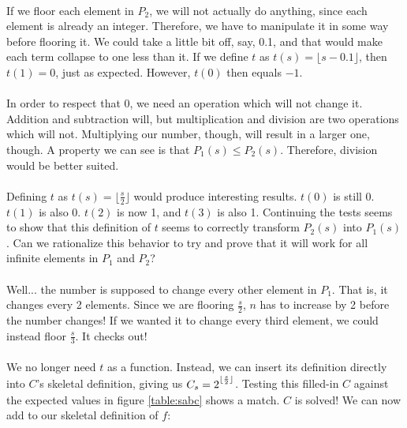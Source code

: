 \documentclass[12pt,letterpaper]{article}
\begin{document}
			\paragraph{} If we floor each element in $P_2$, we will not actually do anything, since each element is already an integer. Therefore, we have to manipulate it in some way before flooring it. We could take a little bit off, say, 0.1, and that would make each term collapse to one less than it. If we define $t$ as $t(s) = \lfloor s - 0.1 \rfloor$, then $t(1) = 0$, just as expected. However, $t(0)$ then equals $-1$.
			
			\paragraph{} In order to respect that 0, we need an operation which will not change it. Addition and subtraction will, but multiplication and division are two operations which will not. Multiplying our number, though, will result in a larger one, though. A property we can see is that $P_1(s) \leqslant P_2(s)$. Therefore, division would be better suited.
			
			\paragraph{} Defining $t$ as $t(s) = \lfloor \frac{s}{2} \rfloor$ would produce interesting results. $t(0)$ is still 0. $t(1)$ is also 0. $t(2)$ is now 1, and $t(3)$ is also 1. Continuing the tests seems to show that this definition of $t$ seems to correctly transform $P_2(s)$ into $P_1(s)$. Can we rationalize this behavior to try and prove that it will work for all infinite elements in $P_1$ and $P_2$?
			
			\paragraph{} Well... the number is supposed to change every other element in $P_1$. That is, it changes every 2 elements. Since we are flooring $\frac{s}{2}$, $n$ has to increase by 2 before the number changes! If we wanted it to change every third element, we could instead floor $\frac{s}{3}$. It checks out!
			
			\paragraph{} We no longer need $t$ as a function. Instead, we can insert its definition directly into $C$'s skeletal definition, giving us $C_s = 2\strut^{\lfloor \frac{s}{2} \rfloor}$. Testing this filled-in $C$ against the expected values in figure \ref{table:sabc} shows a match. $C$ is solved! We can now add to our skeletal definition of $f$:
			
\end{document}
